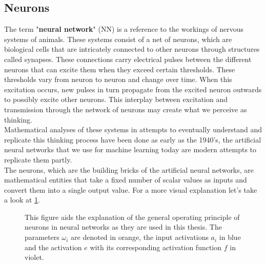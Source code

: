 \subsection{Neurons}
The term "\textbf{neural network}" (NN) is a reference to the workings of nervous systems of animals. These systems consist of a net of neurons, which are biological cells that are intricately connected to other neurons through structures called synapses. These connections carry electrical pulses between the different neurons that can excite them when they exceed certain thresholds. These thresholds vary from neuron to neuron and change over time. When this excitation occurs, new pulses in turn propagate from the excited neuron outwards to possibly excite other neurons. This interplay between excitation and transmission through the network of neurons may create what we perceive as thinking.\\
Mathematical analyses of these systems in attempts to eventually understand and replicate this thinking process have been done as early as the 1940's\cite{A_logical_calculus_of_the_ideas_immanent_in_nervous_activity}, the artificial neural networks that we use for machine learning today are modern attempts to replicate them partly.\\
The neurons, which are the building bricks of the artificial neural networks, are mathematical entities that take a fixed number of scalar values as inputs and convert them into a single output value. For a more visual explanation let's take a look at \cref{fig:Neuron_explanation}.
\begin{figure}
	\centering
	
	\caption{This figure aids the explanation of the general operating principle of neurons in neural networks as they are used in this thesis. The parameters $\omega_i$ are denoted in orange, the input activations $a_i$ in blue and the activation $e$ with its corresponding activation function $f$ in violet.}
	\label{fig:Neuron_explanation}
\end{figure}
